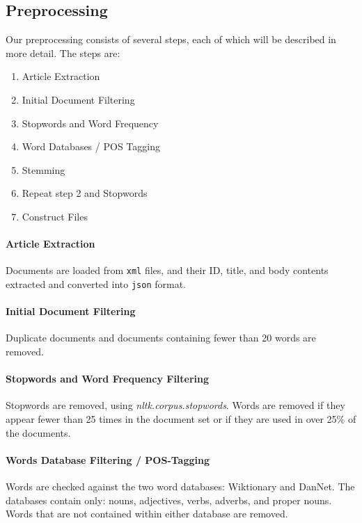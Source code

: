\subsection{Preprocessing}\label{subsec:prepro} 

Our preprocessing consists of several steps, each of which will be described in more detail.
The steps are:
\begin{enumerate}
	\item Article Extraction
	\item Initial Document Filtering
	\item Stopwords and Word Frequency
	\item Word Databases / POS Tagging
	\item Stemming
	\item Repeat step 2 and Stopwords
	\item Construct Files
\end{enumerate}

\paragraph{Article Extraction}
Documents are loaded from \texttt{xml} files, and their ID, title, and body contents extracted and converted into \texttt{json} format.

\paragraph{Initial Document Filtering}
Duplicate documents and documents containing fewer than 20 words are removed.

\paragraph{Stopwords and Word Frequency Filtering}
Stopwords are removed, using \emph{nltk.corpus.stopwords}. 
Words are removed if they appear fewer than 25 times in the document set or if they are used in over 25\% of the documents.

\paragraph{Words Database Filtering / POS-Tagging}
Words are checked against the two word databases: Wiktionary and DanNet. 
The databases contain only: nouns, adjectives, verbs, adverbs, and proper nouns. 
Words that are not contained within either database are removed.

